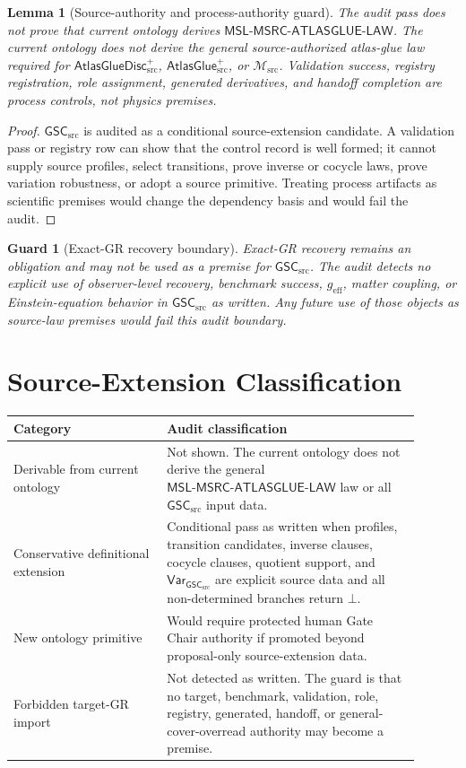 \documentclass[11pt]{article}
\newcommand{\Msrc}{\mathcal{M}_{\mathrm{src}}}
\newcommand{\geff}{g_{\mathrm{eff}}}
\newcommand{\AtlasGlue}{\mathsf{AtlasGlue}_{\mathrm{src}}^{+}}
\newcommand{\AtlasGlueDisc}{\mathsf{AtlasGlueDisc}_{\mathrm{src}}^{+}}
\newcommand{\MSL}{\mathsf{MSL}\mbox{-}\mathsf{MSRC}\mbox{-}\mathsf{ATLASGLUE}\mbox{-}\mathsf{LAW}}
\newcommand{\GSC}{\mathsf{GSC}_{\mathrm{src}}}
\newcommand{\Vargsc}{\mathsf{Var}_{\GSC}}
\newcommand{\Bot}{\bot}
\newtheorem{lemma}{Lemma}
\newtheorem{guard}{Guard}
\begin{document}
\begin{lemma}[Source-authority and process-authority guard]
The audit pass does not prove that current ontology derives \(\MSL\). The
current ontology does not derive the general source-authorized atlas-glue law
required for \(\AtlasGlueDisc\), \(\AtlasGlue\), or \(\Msrc\). Validation
success, registry registration, role assignment, generated derivatives, and
handoff completion are process controls, not physics premises.
\end{lemma}

\begin{proof}
\(\GSC\) is audited as a conditional source-extension candidate. A validation
pass or registry row can show that the control record is well formed; it
cannot supply source profiles, select transitions, prove inverse or cocycle
laws, prove variation robustness, or adopt a source primitive. Treating
process artifacts as scientific premises would change the dependency basis
and would fail the audit.
\end{proof}

\begin{guard}[Exact-GR recovery boundary]
Exact-GR recovery remains an obligation and may not be used as a premise for
\(\GSC\). The audit detects no explicit use of observer-level recovery,
benchmark success, \(\geff\), matter coupling, or Einstein-equation behavior
in \(\GSC\) as written. Any future use of those objects as source-law
premises would fail this audit boundary.
\end{guard}

\section{Source-Extension Classification}

\begin{center}
\begin{tabular}{p{0.34\linewidth}p{0.56\linewidth}}
\hline
Category & Audit classification \\
\hline
Derivable from current ontology & Not shown. The current ontology does not
derive the general \(\MSL\) law or all \(\GSC\) input data. \\
Conservative definitional extension & Conditional pass as written when
profiles, transition candidates, inverse clauses, cocycle clauses, quotient
support, and \(\Vargsc\) are explicit source data and all non-determined
branches return \(\Bot\). \\
New ontology primitive & Would require protected human Gate Chair authority
if promoted beyond proposal-only source-extension data. \\
Forbidden target-GR import & Not detected as written. The guard is that no
target, benchmark, validation, role, registry, generated, handoff, or
general-cover-overread authority may become a premise. \\
\hline
\end{tabular}
\end{center}
\end{document}
